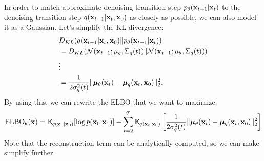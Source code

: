 In order to match approximate denoising transition step $p_\theta({\mathbf{x}}_{t-1}|{\mathbf{x}}_{t})$ to the denoising transition step $q({\mathbf{x}}_{t-1}|{\mathbf{x}}_t, {\mathbf{x}}_0)$ as closely as possible, we can also model it as a Gaussian. Let's simplify the KL divergence:
\begin{align*}
	&D_{KL}(q({\mathbf{x}}_{t-1}|{\mathbf{x}}_t, {\mathbf{x}}_0)\|p_\theta({\mathbf{x}}_{t-1}|{\mathbf{x}}_{t}))\\ 
	&= D_{KL}(\mathcal{N}({\mathbf{x}}_{t-1};\mu_q,\Sigma_q(t))\|\mathcal{N}({\mathbf{x}}_{t-1};\mu_\theta,\Sigma_q(t)))\\ 
	& \vdots\\ 
	&= \frac{1}{2\sigma^2_q(t)}\|\boldsymbol{\mu}_\theta({\mathbf{x}}_t)- \boldsymbol{\mu}_q({\mathbf{x}}_t, {\mathbf{x}}_0)\|^2_2.
\end{align*}
By using this, we can rewrite the ELBO that we want to maximize:
\begin{align*}
	\text{ELBO}_\theta({\mathbf{x}}) = \mathbb{E}_{q({\mathbf{x}}_{1}|{\mathbf{x}}_0)}[\log p({\mathbf{x}}_0|{\mathbf{x}}_{1})] -\sum_{t=2}^{T}\mathbb{E}_{q({\mathbf{x}}_{t}|{\mathbf{x}}_0)}\left[\frac{1}{2\sigma^2_q(t)}\|\boldsymbol{\mu}_\theta({\mathbf{x}}_t)- \boldsymbol{\mu}_q({\mathbf{x}}_t, {\mathbf{x}}_0)\|^2_2\right]
\end{align*}
Note that the reconstruction term can be analytically computed, so we can make simplify further. 


